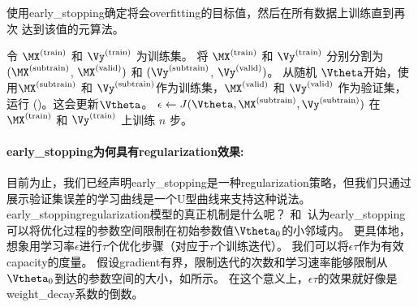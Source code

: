 \begin{algorithm}[ht]
\caption{
使用\gls{early_stopping}确定将会\gls{overfitting}的目标值，然后在所有数据上训练直到再次
达到该值的元算法。
}
\label{alg:early_stopping_continue}
\begin{algorithmic}
\STATE 令 $\MX^{(\text{train})}$ 和 $\Vy^{(\text{train})}$ 为训练集。
\STATE 将 $\MX^{(\text{train})}$ 和 $\Vy^{(\text{train})}$ 分别分割为 $(\MX^{(\text{subtrain})}$, $\MX^{(\text{valid})})$ 和 $(\Vy^{(\text{subtrain})}$, $\Vy^{(\text{valid})})$。
\STATE 从随机 $\Vtheta$开始，使用$\MX^{(\text{subtrain})}$ 和 $\Vy^{(\text{subtrain})}$作为训练集，$\MX^{(\text{valid})}$ 和 $\Vy^{(\text{valid})}$ 作为验证集，运行 ()。这会更新$\Vtheta$。
\STATE $\epsilon \leftarrow J(\Vtheta, \MX^{(\text{subtrain})},\Vy^{(\text{subtrain})})$
\STATE 在 $\MX^{(\text{train})}$ 和 $\Vy^{(\text{train})}$ 上训练 $n$ 步。  
\ENDWHILE
\end{algorithmic}
\end{algorithm}



\paragraph{\gls{early_stopping}为何具有\gls{regularization}效果:}
目前为止，我们已经声明\gls{early_stopping}是一种\gls{regularization}策略，但我们只通过展示验证集误差的学习曲线是一个U型曲线来支持这种说法。
\gls{early_stopping}\gls{regularization}模型的真正机制是什么呢？ 
\cite{Bishop-1995a}和~\cite{Sjoberg-Ljung-1995}认为\gls{early_stopping}可以将优化过程的参数空间限制在初始参数值$\Vtheta_0$的小邻域内。
更具体地，想象用学习率$\epsilon$进行$\tau$个优化步骤（对应于$\tau$个训练迭代）。
我们可以将$\epsilon \tau$作为有效\gls{capacity}的度量。
假设\gls{gradient}有界，限制迭代的次数和学习速率能够限制从$\Vtheta_0$到达的参数空间的大小，如所示。
在这个意义上，$\epsilon \tau$的效果就好像是\gls{weight_decay}系数的倒数。

